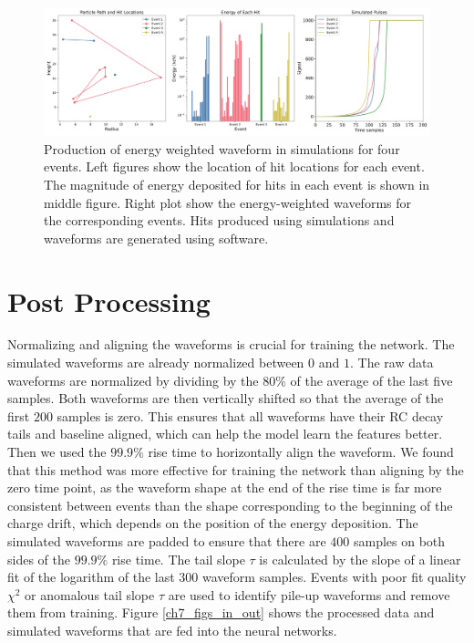 \begin{figure}[htb!]
    \includegraphics[width=0.99\linewidth,trim={1pc 0pc 1pc 0pc},clip]{ch7/figs/hit_sims.pdf}
    \caption{Production of energy weighted waveform in simulations for four events. Left figures show the location of hit locations for each event.  The magnitude of energy deposited for hits in each event is shown in middle figure. Right plot show the energy-weighted waveforms for the corresponding events. Hits produced using {\geant} simulations and waveforms are generated using {\siggen} software.}
   \label{ch7_fig_eng_dep_sim}
\end{figure}

\section{Post Processing}
Normalizing and aligning the waveforms is crucial for training the network. The simulated waveforms are already normalized between $0$ and $1$. The raw data waveforms are normalized by dividing by the $80\%$ of the average of the last five samples. Both waveforms are then vertically shifted so that the average of the first $200$ samples is zero. This ensures that all waveforms have their RC decay tails and baseline aligned, which can help the model learn the features better. Then we used the $99.9\%$ rise time to horizontally align the waveform. We found that this method was more effective for training the network than aligning by the zero time point, as the waveform shape at the end of the rise time is far more consistent between events than the shape corresponding to the beginning of the charge drift, which depends on the position of the energy deposition. The simulated waveforms are padded to ensure that there are $400$ samples on both sides of the $99.9\%$ rise time. The tail slope $\tau$ is calculated by the slope of a linear fit of the logarithm of the last $300$ waveform samples. Events with poor fit quality $\chi^2$ or anomalous tail slope $\tau$ are used to identify pile-up waveforms and remove them from training. Figure \ref{ch7_figs_in_out} shows the processed data and simulated waveforms that are fed into the neural networks.

